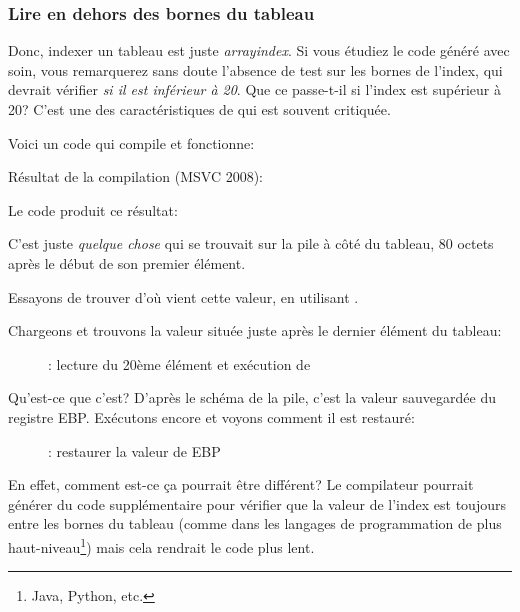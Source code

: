 \subsubsection{Lire en dehors des bornes du tableau}

Donc, indexer un tableau est juste \emph{array\lbrack{}index\rbrack}.
Si vous étudiez le code généré avec soin, vous remarquerez sans doute l'absence de
test sur les bornes de l'index, qui devrait vérifier \emph{si il est inférieur à 20}.
Que ce passe-t-il si l'index est supérieur à 20?
C'est une des caractéristiques de \CCpp qui est souvent critiquée.

Voici un code qui compile et fonctionne:



Résultat de la compilation (MSVC 2008):



Le code produit ce résultat:



C'est juste \emph{quelque chose} qui se trouvait sur la pile à côté du tableau, 80 octets
après le début de son premier élément.

\clearpage
\myindex{\olly}
Essayons de trouver d'où vient cette valeur, en utilisant \olly.

Chargeons et trouvons la valeur située juste après le dernier élément du tableau:

\begin{figure}[H]
\centering
{}
\caption{\olly: lecture du 20ème élément et exécution de \printf}
\label{fig:array_BO_olly_r1}
\end{figure}

Qu'est-ce que c'est?
D'après le schéma de la pile, c'est la valeur sauvegardée du registre EBP.
\clearpage
Exécutons encore et voyons comment il est restauré:

\begin{figure}[H]
\centering
{}
\caption{\olly: restaurer la valeur de EBP}
\label{fig:array_BO_olly_r2}
\end{figure}

En effet, comment est-ce ça pourrait être différent?
Le compilateur pourrait générer du code supplémentaire pour vérifier que la valeur
de l'index est toujours entre les bornes du tableau (comme dans les langages de
programmation de plus haut-niveau\footnote{Java, Python, etc.}) mais cela rendrait
le code plus lent.

